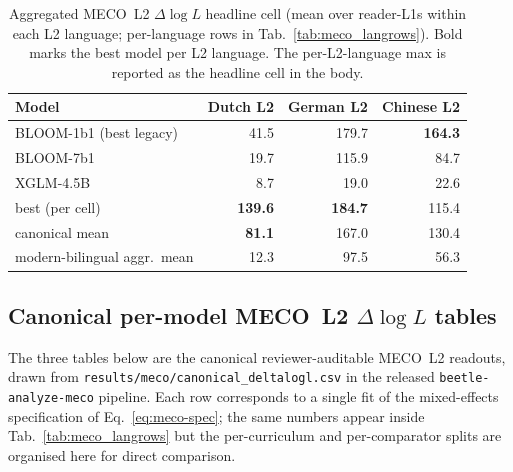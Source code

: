 \begin{table}[!ht]
\centering
\small
\caption{Aggregated MECO~L2 $\Delta\log L$ headline cell (mean over reader-L1s within each L2 language; per-language rows in Tab.~\ref{tab:meco_langrows}). Bold marks the best model per L2 language. The \beetle{} per-L2-language max is reported as the headline cell in the body.}
\label{tab:meco}
\begin{tabular}{lrrr}
\toprule
Model & Dutch L2 & German L2 & Chinese L2 \\
\midrule
BLOOM-1b1 (best legacy) & 41.5 & 179.7 & \textbf{164.3} \\
BLOOM-7b1               & 19.7 & 115.9 & 84.7 \\
XGLM-4.5B               & 8.7  & 19.0  & 22.6 \\
\beetle{} best (per cell) & \textbf{139.6} & \textbf{184.7} & 115.4 \\
\beetle{} canonical mean & \textbf{81.1} & 167.0 & 130.4 \\
modern-bilingual aggr.\ mean & 12.3 & 97.5 & 56.3 \\
\bottomrule
\end{tabular}
\end{table}

\subsection{Canonical per-model MECO~L2 $\Delta\log L$ tables}\label{sec:meco-canonical-tables}

The three tables below are the canonical reviewer-auditable MECO~L2 readouts, drawn from \texttt{results/meco/canonical\_deltalogl.csv} in the released \texttt{beetle-analyze-meco} pipeline. Each row corresponds to a single fit of the mixed-effects specification of Eq.~\ref{eq:meco-spec}; the same numbers appear inside Tab.~\ref{tab:meco_langrows} but the per-curriculum and per-comparator splits are organised here for direct comparison.

